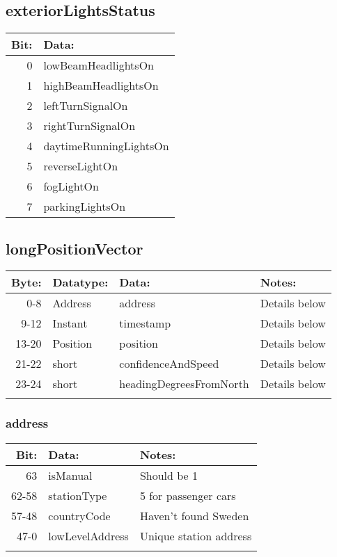 \documentclass[11pt]{article}
\begin{document}
\subsection{exteriorLightsStatus}
\label{sec:orgheadline3}
\begin{center}
\begin{tabular}{rl}
\hline
Bit: & Data:\\
\hline
0 & lowBeamHeadlightsOn\\
1 & highBeamHeadlightsOn\\
2 & leftTurnSignalOn\\
3 & rightTurnSignalOn\\
4 & daytimeRunningLightsOn\\
5 & reverseLightOn\\
6 & fogLightOn\\
7 & parkingLightsOn\\
\end{tabular}
\end{center}

\subsection{longPositionVector}
\label{sec:orgheadline9}
\begin{center}
\begin{tabular}{rlll}
\hline
Byte: & Datatype: & Data: & Notes:\\
\hline
0-8 & Address & address & Details below\\
9-12 & Instant & timestamp & Details below\\
13-20 & Position & position & Details below\\
21-22 & short & confidenceAndSpeed & Details below\\
23-24 & short & headingDegreesFromNorth & Details below\\
 &  &  & \\
\end{tabular}
\end{center}


\subsubsection{address}
\label{sec:orgheadline4}
\begin{center}
\begin{tabular}{rll}
\hline
Bit: & Data: & Notes:\\
\hline
63 & isManual & Should be 1\\
62-58 & stationType & 5 for passenger cars\\
57-48 & countryCode & Haven't found Sweden\\
47-0 & lowLevelAddress & Unique station address\\
 &  & \\
\end{tabular}
\end{center}
\end{document}
